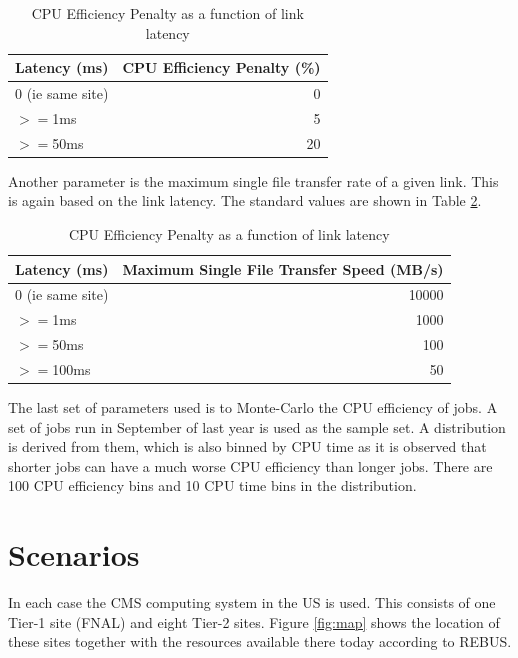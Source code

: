 \documentclass[a4paper]{jpconf}
\begin{document}
\begin{table}
  \begin{center}
    \begin{tabular}{|l|r|}
      \hline
      Latency (ms) & CPU Efficiency Penalty (\%) \\
      \hline
      0 (ie same site) & 0 \\
      $>=$1ms & 5 \\
      $>=$50ms & 20 \\
      \hline
    \end{tabular}
    \caption{CPU Efficiency Penalty as a function of link latency\label{tab:cpuHIT}}
  \end{center}
\end{table}

Another parameter is the maximum single file transfer rate of a given
link. This is again based on the link latency. The standard values are
shown in Table \ref{tab:linkLatency}.

\begin{table}
  \begin{center}
    \begin{tabular}{|l|r|}
      \hline
      Latency (ms) &  Maximum Single File Transfer Speed (MB/s) \\
      \hline
      0 (ie same site) & 10000 \\
      $>=$1ms & 1000 \\
      $>=$50ms & 100 \\
      $>=$100ms & 50 \\
      \hline
    \end{tabular}
    \caption{CPU Efficiency Penalty as a function of link
      latency\label{tab:linkLatency}}
  \end{center}
\end{table}

The last set of parameters used is to Monte-Carlo the CPU efficiency
of jobs. A set of jobs run in September of last year is used as the
sample set. A distribution is derived from them, which is also binned
by CPU time as it is observed that shorter jobs can have a much worse
CPU efficiency than longer jobs. There are 100 CPU efficiency bins and
10 CPU time bins in the distribution.

\section{Scenarios}

In each case the CMS computing system in the US is used. This consists
of one Tier-1 site (FNAL) and eight Tier-2 sites. Figure \ref{fig:map}
shows the location of these sites together with the resources
available there today according to REBUS.
\end{document}
